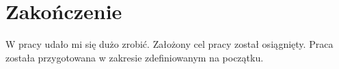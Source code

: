 
\chapter{Zakończenie}

W pracy udało mi się dużo zrobić. Założony cel pracy został osiągnięty. Praca została przygotowana w zakresie zdefiniowanym na początku. 

\lipsum[17]

